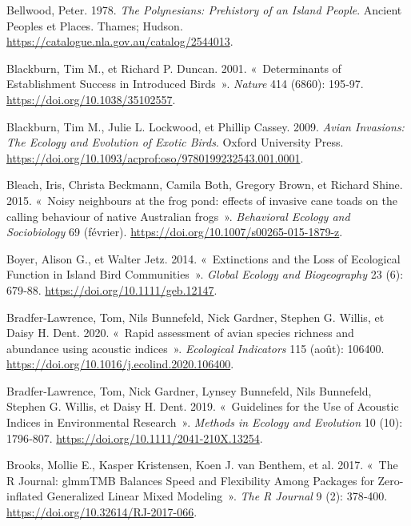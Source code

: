\documentclass[
  french,
  11pt,
]{stylisharticle}
\newlength{\cslhangindent}
\newenvironment{CSLReferences}[2] %
 {\begin{list}{}{%
  \setlength{\itemindent}{0pt}
  \setlength{\leftmargin}{0pt}
  \setlength{\parsep}{0pt}
  \ifodd #1
   \setlength{\leftmargin}{\cslhangindent}
   \setlength{\itemindent}{-1\cslhangindent}
  \fi
  \setlength{\itemsep}{#2\baselineskip}}}
 {\end{list}}
\begin{document}
\protect{}\label{refs}
\begin{CSLReferences}{1}{1}
Bellwood, Peter. 1978. \emph{The Polynesians: Prehistory of an Island
People}. Ancient Peoples et Places. Thames; Hudson.
\url{https://catalogue.nla.gov.au/catalog/2544013}.

Blackburn, Tim M., et Richard P. Duncan. 2001. {«~Determinants of
Establishment Success in Introduced Birds~»}. \emph{Nature} 414 (6860):
195‑97. \url{https://doi.org/10.1038/35102557}.

Blackburn, Tim M., Julie L. Lockwood, et Phillip Cassey. 2009.
\emph{Avian Invasions: The Ecology and Evolution of Exotic Birds}.
Oxford University Press.
\url{https://doi.org/10.1093/acprof:oso/9780199232543.001.0001}.

Bleach, Iris, Christa Beckmann, Camila Both, Gregory Brown, et Richard
Shine. 2015. {«~Noisy neighbours at the frog pond: effects of invasive
cane toads on the calling behaviour of native Australian frogs~»}.
\emph{Behavioral Ecology and Sociobiology} 69 (février).
\url{https://doi.org/10.1007/s00265-015-1879-z}.

Boyer, Alison G., et Walter Jetz. 2014. {«~Extinctions and the Loss of
Ecological Function in Island Bird Communities~»}. \emph{Global Ecology
and Biogeography} 23 (6): 679‑88.
\url{https://doi.org/10.1111/geb.12147}.

Bradfer-Lawrence, Tom, Nils Bunnefeld, Nick Gardner, Stephen G. Willis,
et Daisy H. Dent. 2020. {«~Rapid assessment of avian species richness
and abundance using acoustic indices~»}. \emph{Ecological Indicators}
115 (août): 106400. \url{https://doi.org/10.1016/j.ecolind.2020.106400}.

Bradfer-Lawrence, Tom, Nick Gardner, Lynsey Bunnefeld, Nils Bunnefeld,
Stephen G. Willis, et Daisy H. Dent. 2019. {«~Guidelines for the Use of
Acoustic Indices in Environmental Research~»}. \emph{Methods in Ecology
and Evolution} 10 (10): 1796‑807.
\url{https://doi.org/10.1111/2041-210X.13254}.

Brooks, Mollie E., Kasper Kristensen, Koen J. van Benthem, et al. 2017.
{«~The R Journal: glmmTMB Balances Speed and Flexibility Among Packages
for Zero-inflated Generalized Linear Mixed Modeling~»}. \emph{The R
Journal} 9 (2): 378‑400. \url{https://doi.org/10.32614/RJ-2017-066}.


\end{CSLReferences}
\end{document}
